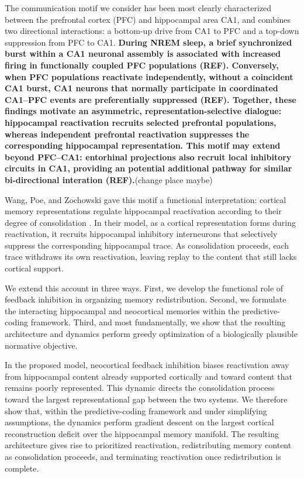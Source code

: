\documentclass[10pt,letterpaper]{article}
\theoremstyle{plain}
\theoremstyle{remark}
\begin{document}
The communication motif we consider has been most clearly characterized between the prefrontal cortex (PFC) and hippocampal area CA1, and combines two directional interactions: a bottom-up drive from CA1 to PFC and a top-down suppression from PFC to CA1. \textbf{During NREM sleep, a brief synchronized burst within a CA1 neuronal assembly is associated with increased firing in functionally coupled PFC populations (REF). Conversely, when PFC populations reactivate independently, without a coincident CA1 burst, CA1 neurons that normally participate in coordinated CA1–PFC events are preferentially suppressed (REF). Together, these findings motivate an asymmetric, representation-selective dialogue: hippocampal reactivation recruits selected prefrontal populations, whereas independent prefrontal reactivation suppresses the corresponding hippocampal representation. This motif may extend beyond PFC–CA1: entorhinal projections also recruit local inhibitory circuits in CA1, providing an potential additional pathway for similar bi-directional interation (REF).}(change place maybe)

Wang, Poe, and Zochowski gave this motif a functional interpretation: cortical memory representations regulate hippocampal reactivation according to their degree of consolidation \cite{wang2008heterogeneities}. In their model, as a cortical representation forms during reactivation, it recruits hippocampal inhibitory interneurons that selectively suppress the corresponding hippocampal trace. As consolidation proceeds, each trace withdraws its own reactivation, leaving replay to the content that still lacks cortical support.

We extend this account in three ways. First, we develop the functional role of feedback inhibition in organizing memory redistribution. Second, we formulate the interacting hippocampal and neocortical memories within the predictive-coding framework. Third, and most fundamentally, we show that the resulting architecture and dynamics perform greedy optimization of a biologically plausible normative objective.

In the proposed model, neocortical feedback inhibition biases reactivation away from hippocampal content already supported cortically and toward content that remains poorly represented. This dynamic directs the consolidation process toward the largest representational gap between the two systems. We therefore show that, within the predictive-coding framework and under simplifying assumptions, the dynamics perform gradient descent on the largest cortical reconstruction deficit over the hippocampal memory manifold. The resulting architecture gives rise to prioritized reactivation, redistributing memory content as consolidation proceeds, and terminating reactivation once redistribution is complete.
\end{document}
